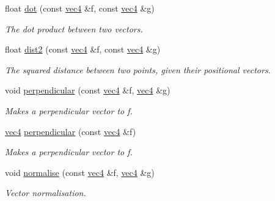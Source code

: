 \begin{DoxyCompactItemize}
\mbox{\label{namespacephysim_1_1math_acf476bb85d5f1270d9fc081e343fe4c1}} 
float \hyperlink{namespacephysim_1_1math_acf476bb85d5f1270d9fc081e343fe4c1}{dot} (const \hyperlink{structphysim_1_1math_1_1vec4}{vec4} \&f, const \hyperlink{structphysim_1_1math_1_1vec4}{vec4} \&g)
\begin{DoxyCompactList}\small\item\em The dot product between two vectors. \end{DoxyCompactList}\item 
\mbox{\label{namespacephysim_1_1math_ade7d952497aa228c6a037643f03e655c}} 
float \hyperlink{namespacephysim_1_1math_ade7d952497aa228c6a037643f03e655c}{dist2} (const \hyperlink{structphysim_1_1math_1_1vec4}{vec4} \&f, const \hyperlink{structphysim_1_1math_1_1vec4}{vec4} \&g)
\begin{DoxyCompactList}\small\item\em The squared distance between two points, given their positional vectors. \end{DoxyCompactList}\item 
void \hyperlink{namespacephysim_1_1math_a5df531bc331e7f1b439ce5d65d1853bf}{perpendicular} (const \hyperlink{structphysim_1_1math_1_1vec4}{vec4} \&f, \hyperlink{structphysim_1_1math_1_1vec4}{vec4} \&g)
\begin{DoxyCompactList}\small\item\em Makes a perpendicular vector to {\itshape f}. \end{DoxyCompactList}\item 
\hyperlink{structphysim_1_1math_1_1vec4}{vec4} \hyperlink{namespacephysim_1_1math_a7c59997429c9f892398287810f23371a}{perpendicular} (const \hyperlink{structphysim_1_1math_1_1vec4}{vec4} \&f)
\begin{DoxyCompactList}\small\item\em Makes a perpendicular vector to {\itshape f}. \end{DoxyCompactList}\item 
void \hyperlink{namespacephysim_1_1math_ab056ca8acc427646fa969864a34efd18}{normalise} (const \hyperlink{structphysim_1_1math_1_1vec4}{vec4} \&f, \hyperlink{structphysim_1_1math_1_1vec4}{vec4} \&g)
\begin{DoxyCompactList}\small\item\em Vector normalisation. \end{DoxyCompactList}\item 

\end{DoxyCompactItemize}
